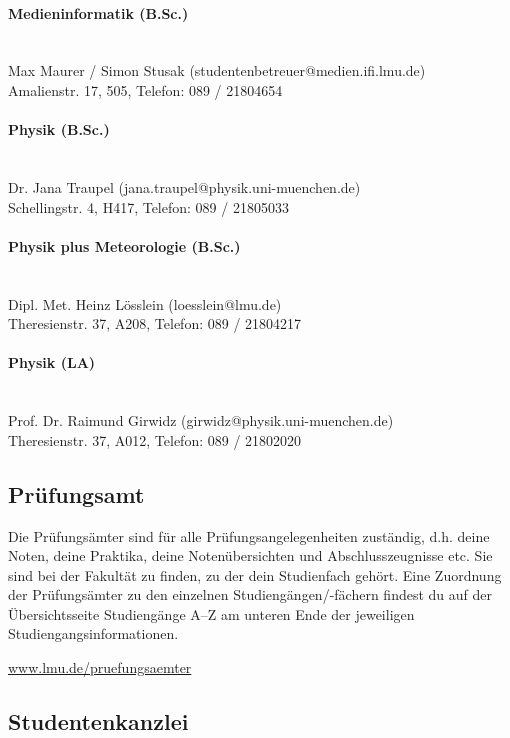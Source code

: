 \documentclass[twoside,12pt,parskip=half-]{scrartcl}
\newcommand{\emd}{\textendash}
\begin{document}
\paragraph{Medieninformatik (B.Sc.)}\hfill\\
Max Maurer / Simon Stusak (studentenbetreuer@medien.ifi.lmu.de)\\
Amalienstr. 17, 505, Telefon: 089 / 2180\emd{}4654

\paragraph{Physik (B.Sc.)}\hfill\\
Dr. Jana Traupel (jana.traupel@physik.uni-muenchen.de)\\
Schellingstr. 4, H417, Telefon: 089 / 2180\emd{}5033

\paragraph{Physik plus Meteorologie (B.Sc.)}\hfill\\
Dipl. Met. Heinz Lösslein (loesslein@lmu.de)\\
Theresienstr. 37, A208, Telefon: 089 / 2180\emd{}4217

\paragraph{Physik (LA)}\hfill\\
Prof. Dr. Raimund Girwidz (girwidz@physik.uni-muenchen.de)\\
Theresienstr. 37, A012, Telefon: 089 / 2180\emd{}2020



\subsection{Prüfungsamt}
Die Prüfungsämter sind für alle Prüfungsangelegenheiten zuständig,
d.h. deine Noten, deine Praktika, deine Notenübersichten und
Abschlusszeugnisse etc. Sie sind bei der Fakultät zu finden, zu der
dein Studienfach gehört. Eine Zuordnung der Prüfungsämter zu den
einzelnen Studiengängen/-fächern findest du auf der Übersichtsseite
Studiengänge A--Z am unteren Ende der jeweiligen
Studiengangsinformationen.

\url{www.lmu.de/pruefungsaemter}

\clearpage

\subsection{Studentenkanzlei}
\end{document}
